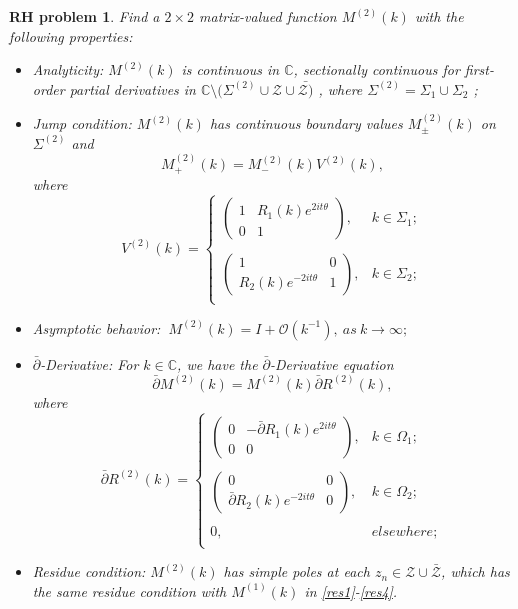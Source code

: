 \documentclass[11pt]{article}
\numberwithin{equation}{section}
\newtheorem{RHP}{RH problem}
\begin{document}
\begin{RHP}
    Find a $2\times 2$ matrix-valued function $M^{(2)}(k)$ with the following properties:
\begin{itemize}
  \item Analyticity: $M^{(2)}(k)$ is continuous in $\mathbb{C}$, sectionally continuous for first-order partial derivatives in $\mathbb{C}\setminus(\Sigma^{(2)}\cup\mathcal{Z}\cup\bar{\mathcal{Z})}$  , where $\Sigma^{(2)}=\Sigma_1\cup\Sigma_2$  ;
  \item Jump condition: $M^{(2)}(k)$ has continuous boundary values $M^{(2)}_{\pm}(k)$ on $\Sigma^{(2)}$ and
 \begin{equation*}
M^{(2)}_+(k)=M^{(2)}_-(k)V^{(2)}(k),
\end{equation*}
where
\begin{equation*}
V^{(2)}(k)=\left\{\begin{array}{lll}
\left(\begin{array}{cc}
1 & R_{1}(k)e^{2it\theta}\\
0 & 1
\end{array}\right), & k\in \Sigma_{1};\\
\\
\left(\begin{array}{cc}
1 & 0\\
R_{2}(k)e^{-2it\theta} & 1
\end{array}\right),  &k\in \Sigma_{2};\\

\end{array}\right.
\end{equation*}

  \item Asymptotic behavior:
  $\ M^{(2)}(k)=I+\mathcal{O}(k^{-1}),\ as \ k\to \infty;$
  \item $\bar{\partial}$-Derivative: For $k\in\mathbb{C}$, we have the $\bar{\partial}$-Derivative equation
\begin{equation}
    \bar{\partial}M^{(2)}(k)=M^{(2)}(k)\bar{\partial}R^{(2)}(k),
\end{equation}
where
  \begin{equation}
\bar{\partial}R^{(2)}(k)=\left\{\begin{array}{lll}
\left(\begin{array}{cc}
0 & -\bar{\partial}R_{1}(k)e^{2it\theta}\\
0 & 0
\end{array}\right), & k\in \Omega_{1};\\
\\
\left(\begin{array}{cc}
0 & 0\\
\bar{\partial}R_{2}(k)e^{-2it\theta} & 0
\end{array}\right),  &k\in \Omega_{2};\\
\\
0,  &elsewhere;\\
\end{array}\right.
\end{equation}
\item Residue condition: $M^{(2)}(k)$ has simple poles at each $z_n\in\mathcal{Z}\cup\bar{\mathcal{Z}}$, which  has the same residue condition with $M^{(1)}(k)$ in \eqref{res1}-\eqref{res4}.


\end{itemize}
\end{RHP}
\end{document}

